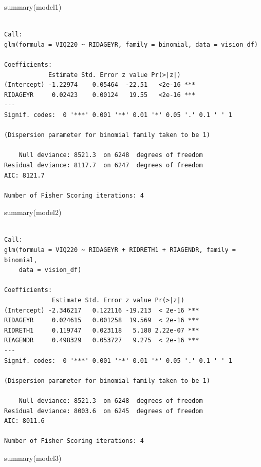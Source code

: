 \documentclass[
  12pt,
]{article}
\newenvironment{Shaded}{\begin{snugshade}}{\end{snugshade}}
\newcommand{\FunctionTok}[1]{\textcolor[rgb]{0.28,0.35,0.67}{#1}}
\newcommand{\NormalTok}[1]{\textcolor[rgb]{0.00,0.23,0.31}{#1}}
\begin{document}
\begin{Shaded}
\begin{Highlighting}[]
\FunctionTok{summary}\NormalTok{(model1)}
\end{Highlighting}
\end{Shaded}

\begin{verbatim}

Call:
glm(formula = VIQ220 ~ RIDAGEYR, family = binomial, data = vision_df)

Coefficients:
            Estimate Std. Error z value Pr(>|z|)    
(Intercept) -1.22974    0.05464  -22.51   <2e-16 ***
RIDAGEYR     0.02423    0.00124   19.55   <2e-16 ***
---
Signif. codes:  0 '***' 0.001 '**' 0.01 '*' 0.05 '.' 0.1 ' ' 1

(Dispersion parameter for binomial family taken to be 1)

    Null deviance: 8521.3  on 6248  degrees of freedom
Residual deviance: 8117.7  on 6247  degrees of freedom
AIC: 8121.7

Number of Fisher Scoring iterations: 4
\end{verbatim}

\begin{Shaded}
\begin{Highlighting}[]
\FunctionTok{summary}\NormalTok{(model2)}
\end{Highlighting}
\end{Shaded}

\begin{verbatim}

Call:
glm(formula = VIQ220 ~ RIDAGEYR + RIDRETH1 + RIAGENDR, family = binomial, 
    data = vision_df)

Coefficients:
             Estimate Std. Error z value Pr(>|z|)    
(Intercept) -2.346217   0.122116 -19.213  < 2e-16 ***
RIDAGEYR     0.024615   0.001258  19.569  < 2e-16 ***
RIDRETH1     0.119747   0.023118   5.180 2.22e-07 ***
RIAGENDR     0.498329   0.053727   9.275  < 2e-16 ***
---
Signif. codes:  0 '***' 0.001 '**' 0.01 '*' 0.05 '.' 0.1 ' ' 1

(Dispersion parameter for binomial family taken to be 1)

    Null deviance: 8521.3  on 6248  degrees of freedom
Residual deviance: 8003.6  on 6245  degrees of freedom
AIC: 8011.6

Number of Fisher Scoring iterations: 4
\end{verbatim}

\begin{Shaded}
\begin{Highlighting}[]
\FunctionTok{summary}\NormalTok{(model3)}
\end{Highlighting}
\end{Shaded}
\end{document}
